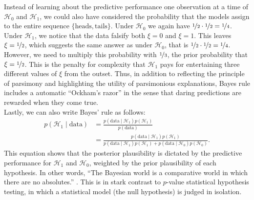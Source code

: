 Instead of learning about the predictive performance one observation at a time of $\mathcal{H}_0$ and $\mathcal{H}_1$, we could also have considered the probability that the models assign to the entire sequence $\{\text{heads}, \text{tails}\}$. Under $\mathcal{H}_0$ we again have $\nicefrac{1}{2} \cdot \nicefrac{1}{2} = \nicefrac{1}{4}$. Under $\mathcal{H}_1$, we notice that the data falsify both $\xi=0$ and $\xi=1$. This leaves $\xi=\nicefrac{1}{2}$, which suggests the same answer as under $\mathcal{H}_0$, that is $\nicefrac{1}{2} \cdot \nicefrac{1}{2} = \nicefrac{1}{4}$. However, we need to multiply this probability with $\nicefrac{1}{3}$, the prior probability that $\xi=\nicefrac{1}{2}$. This is the penalty for complexity that $\mathcal{H}_1$ pays for entertaining three different values of $\xi$ from the outset. Thus, in addition to reflecting the principle of parsimony and highlighting the utility of parsimonious explanations, Bayes rule includes a automatic ``Ockham's razor'' \parencite{Jeffreys1939,JefferysBerger1992} in the sense that daring predictions are rewarded when they come true. \\
 
Lastly, we can also write Bayes' rule as follows:
\begin{equation}
\begin{split}
    p(\mathcal{H}_1 \mid \text{data})& = \frac{p(\text{data} \mid \mathcal{H}_1) p(\mathcal{H}_1)}{p(\text{data})}\\
    & = \frac{p(\text{data} \mid \mathcal{H}_1) p(\mathcal{H}_1)}{p(\text{data} \mid \mathcal{H}_1) p(\mathcal{H}_1) + p(\text{data} \mid \mathcal{H}_0) p(\mathcal{H}_0)}.
\end{split}
\end{equation}
This equation shows that the posterior plausibility is dictated by the predictive performance for $\mathcal{H}_1$ and $\mathcal{H}_0$, weighted by the prior plausibility of each hypothesis. In other words, ``The Bayesian world is a comparative world in which there are no absolutes.'' \parencite[p. 308]{Lindley2000}. This is in stark contrast to $p$-value statistical hypothesis testing, in which a statistical model (the null hypothesis) is judged in isolation. \\ 
